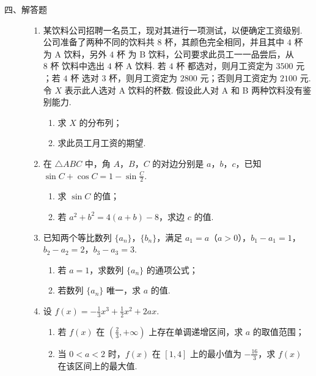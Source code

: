 \begin{description}

    \item[四、解答题]

    \begin{enumerate}[leftmargin=5pt]

      \addtocounter{enumi}{+16}

        \item 某饮料公司招聘一名员工，现对其进行一项测试，以便确定工资级别. 公司准备了两种不同的饮料共 \(8\text{ 杯}\)，其颜色完全相同，并且其中 \(4\text{ 杯}\) 为 A 饮料，另外 \(4\text{ 杯}\) 为 B 饮料，公司要求此员工一一品尝后，从 \(8\text{ 杯}\) 饮料中选出 \(4\text{ 杯}\) A 饮料. 若 \(4\text{ 杯}\) 都选对，则月工资定为 \(3500\text{ 元}\)；若 \(4\text{ 杯}\) 选对 \(3\text{ 杯}\)，则月工资定为 \(2800\text{ 元}\)；否则月工资定为 \(2100\text{ 元}\). 令 \(X\) 表示此人选对 A 饮料的杯数. 假设此人对 A 和 B 两种饮料没有鉴别能力.

\begin{enumerate}
\item 求 \(X\) 的分布列；
\item 求此员工月工资的期望.
\end{enumerate}

        \item 在 \(\triangle ABC\) 中，角 \(A\)，\(B\)，\(C\) 的对边分别是 \(a\)，\(b\)，\(c\)，已知 \(\sin C + \cos C = 1 - \sin \frac{C}{2}\).
\begin{enumerate}
\item 求 \(\sin C\) 的值；
\item 若 \(a^2 + b^2 = 4(a + b) - 8\)，求边 \(c\) 的值.
\end{enumerate}

        \item 已知两个等比数列 \(\{a_{n}\}\)，\(\{b_{n}\}\)，满足 \(a_{1} = a\)（\(a > 0\)），\(b_{1} - a_{1} = 1\)，\(b_{2} - a_{2} = 2\)，\(b_{3} - a_{3} = 3\).
\begin{enumerate}
\item 若 \(a = 1\)，求数列 \(\{a_{n}\}\) 的通项公式；
\item 若数列 \(\{a_{n}\}\) 唯一，求 \(a\) 的值.
\end{enumerate}

        \item 设 \( f(x) = -\frac{1}{3} x^3 + \frac{1}{2} x^2 + 2ax \).
\begin{enumerate}
\item 若 \( f(x) \) 在 \( \left(\frac{2}{3}, +\infty\right) \) 上存在单调递增区间，求 \(a\) 的取值范围；
\item 当 \(0 < a < 2\) 时，\( f(x) \) 在 \([1, 4]\) 上的最小值为 \(-\frac{16}{3}\)，求 \( f(x) \) 在该区间上的最大值.
\end{enumerate}


\end{enumerate}
\end{description}
